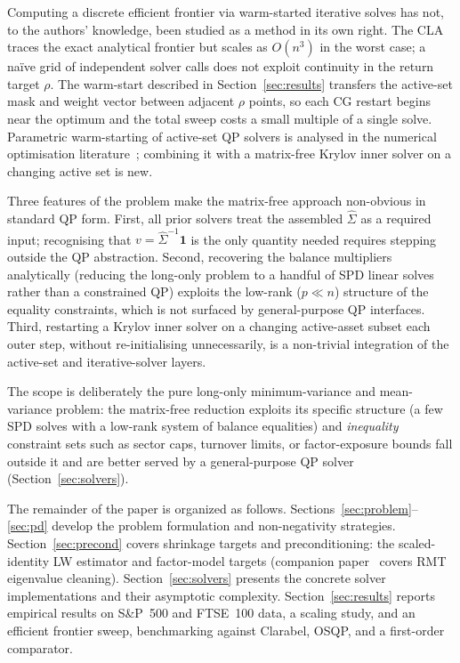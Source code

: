 Computing a discrete efficient frontier via warm-started iterative solves has not,
to the authors' knowledge, been studied as a method in its own right.
The CLA~\cite{markowitz1956,cvxcla} traces the exact analytical frontier but
scales as $O(n^3)$ in the worst case; a na\"{i}ve grid of independent solver calls
does not exploit continuity in the return target $\rho$.
The warm-start described in Section~\ref{sec:results} transfers the active-set mask
and weight vector between adjacent $\rho$ points, so each CG restart begins near
the optimum and the total sweep costs a small multiple of a single solve.
Parametric warm-starting of active-set QP solvers is analysed in the numerical
optimisation literature~\cite{nocedal2006}; combining it with a matrix-free Krylov
inner solver on a changing active set is new.

Three features of the problem make the matrix-free approach non-obvious in standard
QP form. First, all prior solvers treat the assembled $\hat\Sigma$ as a required input;
recognising that $v = \hat\Sigma^{-1}\mathbf{1}$ is the only quantity needed requires
stepping outside the QP abstraction. Second, recovering the balance multipliers
analytically (reducing the long-only problem to a handful of SPD linear solves rather
than a constrained QP) exploits the low-rank ($p \ll n$) structure of the equality
constraints, which is
not surfaced by general-purpose QP interfaces. Third, restarting a Krylov inner solver
on a changing active-asset subset each outer step, without re-initialising unnecessarily,
is a non-trivial integration of the active-set and iterative-solver layers.

The scope is deliberately the pure long-only minimum-variance and mean-variance
problem: the matrix-free reduction exploits its specific structure (a few SPD
solves with a low-rank system of balance equalities) and \emph{inequality} constraint
sets such as sector
caps, turnover limits, or factor-exposure bounds fall outside it and are better served
by a general-purpose QP solver (Section~\ref{sec:solvers}).

The remainder of the paper is organized as follows.
Sections~\ref{sec:problem}--\ref{sec:pd} develop the problem formulation and
non-negativity strategies. Section~\ref{sec:precond} covers shrinkage targets and preconditioning:
the scaled-identity LW estimator and factor-model targets (companion paper~\cite{schmelzer2026rmt} covers RMT eigenvalue cleaning).
Section~\ref{sec:solvers} presents the concrete solver implementations and
their asymptotic complexity. Section~\ref{sec:results} reports empirical results
on S\&P~500 and FTSE~100 data, a scaling study, and an efficient frontier sweep,
benchmarking against Clarabel, OSQP, and a first-order comparator.
